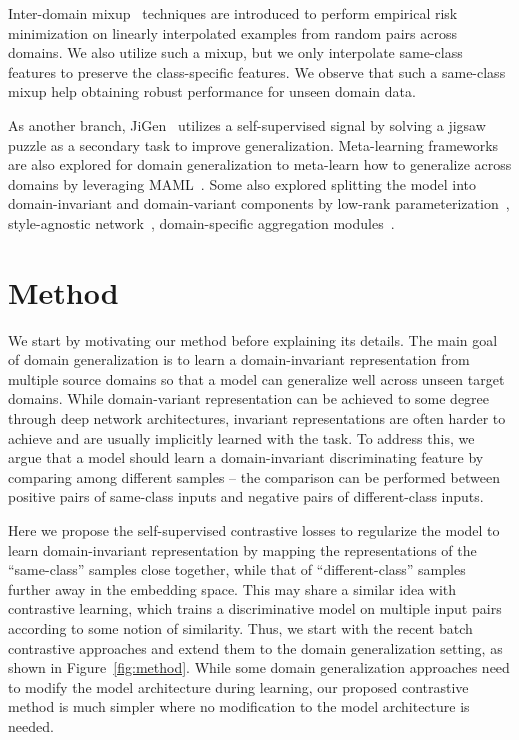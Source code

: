 \documentclass[10pt,twocolumn,letterpaper]{article}
\begin{document}
Inter-domain mixup~\cite{yan2020improve, xu2020adversarial, wang2020heterogeneous} techniques are introduced to perform empirical risk minimization on linearly interpolated examples from random pairs across domains. We also utilize such a mixup, but we only interpolate same-class features to preserve the class-specific features. We observe that such a same-class mixup help obtaining robust performance for unseen domain data.

As another branch, JiGen~\cite{carlucci2019domain} utilizes a self-supervised signal by solving a jigsaw puzzle as a secondary task to improve generalization. Meta-learning frameworks~\cite{li2018learning} are also explored for domain generalization to meta-learn how to generalize across domains by leveraging MAML~\cite{finn2017model}. Some also explored splitting the model into domain-invariant and domain-variant components by low-rank parameterization~\cite{Li2017dg}, style-agnostic network~\cite{nam2019reducing}, domain-specific aggregation modules~\cite{d2018domain}. 


\section{Method}\label{sec:method}
We start by motivating our method before explaining its details. The main goal of domain generalization is to learn a domain-invariant representation from multiple source domains so that a model can generalize well across unseen target domains. While domain-variant representation can be achieved to some degree through deep network architectures, invariant representations are often harder to achieve and are usually implicitly learned with the task. To address this, we argue that a model should learn a domain-invariant discriminating feature by comparing among different samples -- the comparison can be performed between positive pairs of same-class inputs and negative pairs of different-class inputs. 

Here we propose the self-supervised contrastive losses to regularize the model to learn domain-invariant representation by mapping the representations of the ``same-class'' samples close together, while that of ``different-class'' samples further away in the embedding space. This may share a similar idea with contrastive learning, which trains a discriminative model on multiple input pairs according to some notion of similarity. Thus, we start with the recent batch contrastive approaches and extend them to the domain generalization setting, as shown in Figure~\ref{fig:method}. While some domain generalization approaches need to modify the model architecture during learning, our proposed contrastive method is much simpler where no modification to the model architecture is needed.
\end{document}
